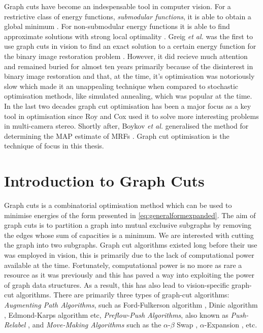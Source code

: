 \begin{definition}
	Graph cuts have become an indespensable tool in computer vision.
	For a restrictive class of energy functions, \textit{submodular functions}, it is able to obtain a global minimum \citep{Kolmogorov2004,Boykov2001_2,Boykvo2001_3,Kolmogorov2007}.
	For non-submodular energy functions it is able to find approximate solutions with strong local optimality \citep{Boykov2001,Kohli2009,Komodakis2007,Kumar2009}.
	Greig \textit{et al.} was the first to use graph cuts in vision to find an exact solution to a certain energy function for the binary image restoration problem \citep{Greig1989}.
	However, it did recieve much attention and remained buried for almost ten years primarily because of the disinterest in binary image restoration and that, at the time, it's optimisation was notoriously slow which made it an unappealing technique when compared to stochastic optimisation methods, like simulated annealing, which was popular at the time.
	In the last two decades graph cut optimisation has been a major focus as a key tool in optimisation since Roy and Cox \citep{Roy1998} used it to solve more interesting problems in multi-camera stereo.
	Shortly after, Boykov \textit{et al.} generalised the method for determining the MAP estimate of MRFs \citep{Boykov1998}.
	Graph cut optimisation is the technique of focus in this thesis.
\end{definition}
  

\section{Introduction to Graph Cuts}
\label{sec:GraphCuts}

Graph cuts is a combinatorial optimisation method which can be used to minimise energies of the form presented in \autoref{eq:generalformexpanded}. The aim of graph cuts is to partition a graph into mutual exclusive subgraphs by removing the edges whose sum of capacities is a minimum. We are interested with cutting the graph into two subgraphs. Graph cut algorithms existed long before their use was employed in vision, this is primarily due to the lack of computational power available at the time. Fortunately, computational power is no more as rare a resource as it was previously and this has paved a way into exploiting the power of graph data structures. As a result, this has also lead to vision-specific graph-cut algorithms. There are primarily three types of graph-cut algorithms: \textit{Augmenting Path Algorithms}, such as Ford-Fulkerson algorithm \citep{Ford1956}, Dinic algorithm \citep{Dinic1970}, Edmond-Karps algorithm \citep{Edmonds1972} etc, \textit{Preflow-Push Algorithms}, also known as \textit{Push-Relabel} \citep{Goldberg1988}, and \textit{Move-Making Algorithms} such as the $\alpha$-$\beta$ Swap \citep{Boykov2001}, $\alpha$-Expansion \citep{Boykov2001}, etc.

